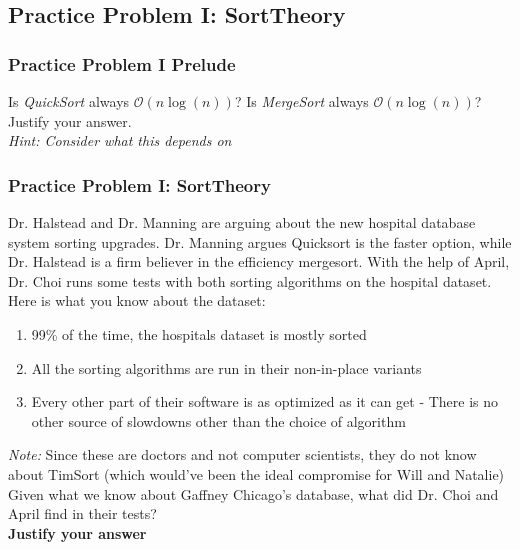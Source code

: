 \documentclass[hyperref={colorlinks,citecolor=blue,linkcolor=blue,urlcolor=blue}, aspectratio=1610]{beamer}
\begin{document}
\subsection{Practice Problem I: SortTheory} 
\begin{frame}
  \frametitle{Practice Problem I Prelude}
  Is \textit{QuickSort} always $\mathcal{O}(n\log(n))$? Is \textit{MergeSort} always $\mathcal{O}(n\log(n))$? Justify your answer.
  \\
  \textit{Hint: Consider what this depends on}
\end{frame}

\begin{frame}[fragile]
  
  \frametitle{Practice Problem I: SortTheory}
    Dr. Halstead and Dr. Manning are arguing about the new hospital database system sorting upgrades. Dr. Manning argues Quicksort is the faster option, while Dr. Halstead is a firm believer in the efficiency mergesort. With the help of April, Dr. Choi runs some tests with both sorting algorithms on the hospital dataset. Here is what you know about the dataset:
    \begin{enumerate}
        \item 99\% of the time, the hospitals dataset is mostly sorted
        \item All the sorting algorithms are run in their non-in-place variants
        \item Every other part of their software is as optimized as it can get - There is no other source of slowdowns other than the choice of algorithm
    \end{enumerate}
    \textit{Note: }Since these are doctors and not computer scientists, they do not know about TimSort (which would’ve been the ideal compromise for Will and Natalie)\\

  Given what we know about Gaffney Chicago's database, what did Dr. Choi and April find in their tests? 
  \\
  \textbf{Justify your answer}

\end{frame}
\end{document}
